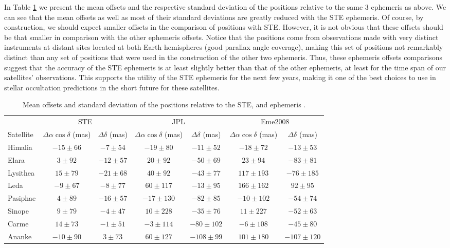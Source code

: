 \documentclass[useAMS,usenatbib]{mn2e}
\begin{document}
In Table \ref{Tab:STE-error} we present the mean offsets and the respective standard deviation of the  positions relative to the same 3 ephemeris as above. We can see that the mean offsets as well as most of their standard deviations are greatly reduced with the STE ephemeris. Of course, by construction, we should expect smaller offsets in the comparison of  positions with STE. However, it is not obvious that these offsets should be that smaller in comparison with the other ephemeris offsets. Notice that the  positions come from observations made with very distinct instruments at distant sites located at both Earth hemispheres (good parallax angle coverage), making this set of positions not remarkably distinct than any set of positions that were used in the construction of the other two ephemeris. Thus, these ephemeris offsets comparisons suggest that the accuracy of the STE ephemeris is at least slightly better than that of the other ephemeris, at least for the time span of our satellites' observations. This supports the utility of the STE ephemeris for the next few years, making it one of the best choices to use in stellar occultation predictions in the short future for these satellites.

\begin{table}
\caption{\label{Tab:STE-error} Mean offsets and standard deviation of the \protect{} positions relative to the STE, \protect\cite{Jacobson2012} and \protect\cite{Emelyanov2005} ephemeris .}
\begin{centering}
\begin{tabular}{l|cc|cc|cc}
\hline  \hline
 & \multicolumn{2}{|c|}{STE} & \multicolumn{2}{|c|}{JPL} & \multicolumn{2}{|c}{Eme2008}\tabularnewline
Satellite  & $\Delta\alpha\cos\delta$ (mas) & $\Delta\delta$ (mas) & $\Delta\alpha\cos\delta$ (mas) & $\Delta\delta$ (mas) & $\Delta\alpha\cos\delta$ (mas) & $\Delta\delta$ (mas) \tabularnewline
\hline
Himalia & $-15\pm66$ & $-7\pm54$  & $-19\pm80$  & $-11\pm52$ & $-18\pm72$  & $-13\pm53$ \tabularnewline
Elara & $3\pm92$ & $-12\pm57$ & $20\pm92$ & $-50\pm69$ & $23\pm94$ & $-83\pm81$ \tabularnewline
Lysithea & $15\pm79$ & $-21\pm68$ & $40\pm92$ & $-43\pm77$ & $117\pm193$ & $-76\pm185$ \tabularnewline
Leda & $-9\pm67$ & $-8\pm77$ & $60\pm117$ & $-13\pm95$ & $166\pm162$ & $92\pm95$ \tabularnewline
Pasiphae & $4\pm89$ & $-16\pm57$ & $-17\pm130$ & $-82\pm85$ & $-10\pm102$ & $-54\pm74$ \tabularnewline
Sinope & $9\pm79$ & $-4\pm47$ & $10\pm228$ & $-35\pm76$ & $11\pm227$ & $-52\pm63$ \tabularnewline
Carme & $14\pm73$ & $-1\pm51$ & $-3\pm114$ & $-80\pm102$ & $-6\pm108$ & $-45\pm80$ \tabularnewline
Ananke & $-10\pm90$ & $3\pm73$ & $60\pm127$ & $-108\pm99$ & $101\pm180$ & $-107\pm120$ \tabularnewline
\hline
\end{tabular}
\par \end{centering}
\end{table}
\end{document}
